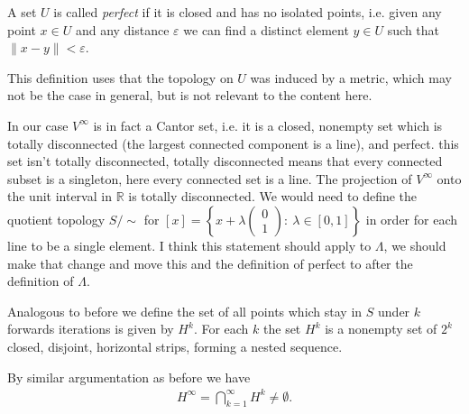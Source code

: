 \begin{definition}
	A set $U$ is called \emph{perfect} if it is closed and has no isolated points, i.e. given any point $x\in U$ and any distance $\varepsilon$ we can find a distinct element $y\in U$ such that $\|x-y\| < \varepsilon$.
\end{definition}
\begin{remark}[]
	This definition uses that the topology on $U$ was induced by a metric, which may not be the case in general, but is not relevant to the content here.
\end{remark}

In our case $V^{\infty }$ is in fact a Cantor set, i.e. it is a closed, nonempty set which is totally disconnected (the largest connected component is a line), and perfect.
{\color{blue} this set isn't totally disconnected, totally disconnected means that every connected subset is a singleton, here every connected set is a line. The projection of $V^{\infty}$ onto the unit interval in $\mathbb{R}$ is totally disconnected. We would need to define the quotient topology $S/\sim$ for $[x] =\left\{x+ \lambda 
	\begin{pmatrix}
		0 \\1
	\end{pmatrix}:\ \lambda \in [0,1] \right\}$ in order for each line to be a single element. I think this statement should apply to $\Lambda$, we should make that change and move this and the definition of perfect to after the definition of $\Lambda$.}

\begin{definition}
	Analogous to before we define the set of all points which stay in $S$ under $k$ forwards iterations is given by $H^{k}$. For each $k$ the set $H ^{k}$ is a nonempty set of $2^k$ closed, disjoint, horizontal strips, forming a nested sequence.
\end{definition}
By similar argumentation as before we have 
\begin{align}
	\boxed{
		H^{\infty } = \bigcap_{k=1}^{\infty} H^{k} \neq \emptyset.
	}
\end{align}

